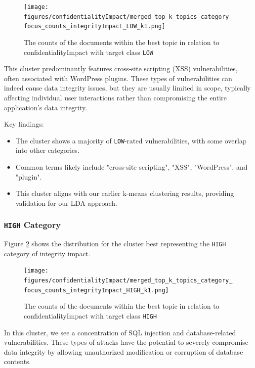 \begin{figure}[h]
	\centering
	\texttt{[image: figures/confidentialityImpact/merged\_top\_k\_topics\_category\_focus\_counts\_integrityImpact\_LOW\_k1.png]}
	\caption{The counts of the documents within the best topic in relation to confidentialityImpact with target class \texttt{LOW}}
	\label{fig:confidentialityImpact_20_LOW}
\end{figure}

This cluster predominantly features cross-site scripting (XSS) vulnerabilities, often associated with WordPress plugins. These types of vulnerabilities can indeed cause data integrity issues, but they are usually limited in scope, typically affecting individual user interactions rather than compromising the entire application's data integrity.

Key findings:
\begin{itemize}
	\item The cluster shows a majority of \texttt{LOW}-rated vulnerabilities, with some overlap into other categories.
	\item Common terms likely include "cross-site scripting", "XSS", "WordPress", and "plugin".
	\item This cluster aligns with our earlier k-means clustering results, providing validation for our LDA approach.
\end{itemize}

\subsubsection{\texttt{HIGH} Category}
Figure \ref{fig:confidentialityImpact_20_HIGH} shows the distribution for the cluster best representing the \texttt{HIGH} category of integrity impact.

\begin{figure}[h]
	\centering
	\texttt{[image: figures/confidentialityImpact/merged\_top\_k\_topics\_category\_focus\_counts\_integrityImpact\_HIGH\_k1.png]}
	\caption{The counts of the documents within the best topic in relation to confidentialityImpact with target class \texttt{HIGH}}
	\label{fig:confidentialityImpact_20_HIGH}
\end{figure}

In this cluster, we see a concentration of SQL injection and database-related vulnerabilities. These types of attacks have the potential to severely compromise data integrity by allowing unauthorized modification or corruption of database contents.


